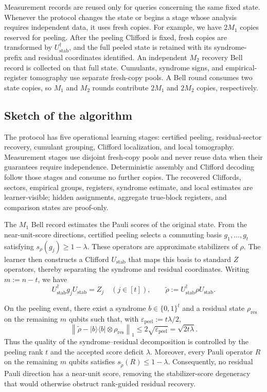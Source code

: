 \documentclass[
  aps,
  prx,
  reprint,
  superscriptaddress,
  amsmath,
  amssymb,
  nofootinbib,
  longbibliography
]{revtex4-2}
\begin{document}
Measurement records are reused only for queries concerning the same fixed state. Whenever the protocol changes the state or begins a stage whose analysis requires independent data, it uses fresh copies.
For example, we have $2M_1$ copies reserved for peeling.  After the
peeling Clifford is fixed, fresh copies are transformed by
$U_{\mathrm{stab}}^\dagger$, and the full peeled state is retained with its
syndrome-prefix and residual coordinates identified.  An independent $M_2$
recovery Bell record is collected on that full state.  Cumulants, syndrome
signs, and empirical-register tomography use separate fresh-copy pools.  A
Bell round consumes two state copies, so $M_1$ and $M_2$ rounds contribute
$2M_1$ and $2M_2$ copies, respectively.

\subsection{Sketch of the algorithm}

The protocol has five operational learning stages: certified peeling,
residual-sector recovery, cumulant grouping, Clifford localization, and local
tomography.  Measurement stages use disjoint fresh-copy pools and never reuse
data when their guarantees require independence.  Deterministic assembly and
Clifford decoding follow those stages and consume no further copies.  The recovered
Cliffords, sectors, empirical groups, registers, syndrome estimate, and local
estimates are learner-visible; hidden assignments, aggregate true-block
registers, and comparison states are proof-only.





The $M_1$ Bell record estimates the Pauli scores of the original state. From
the near-unit-score directions, certified peeling selects a commuting basis
$g_1,\ldots,g_t$ satisfying $s_\rho(g_j)\ge 1-\lambda$. These operators are
approximate stabilizers of $\rho$. The learner then constructs a Clifford
$U_{\mathrm{stab}}$ that maps this basis to standard $Z$ operators, thereby
separating the syndrome and residual coordinates. Writing $m:=n-t$, we have
\begin{equation}
U_{\mathrm{stab}}^\dagger g_jU_{\mathrm{stab}}=Z_j
\quad (j\in[t]),
\qquad
\widetilde\rho
:=
U_{\mathrm{stab}}^\dagger\rho U_{\mathrm{stab}}.
\end{equation}


On the peeling event, there exist a syndrome $b\in\{0,1\}^t$ and a residual
state $\rho_{\mathrm{res}}$ on the remaining $m$ qubits such that, with
$\varepsilon_{\mathrm{peel}}:=t\lambda/2$,
\begin{equation}
\left\|
\widetilde\rho
-
|b\rangle\!\langle b|\otimes\rho_{\mathrm{res}}
\right\|_1
\le
2\sqrt{\varepsilon_{\mathrm{peel}}}
=
\sqrt{2t\lambda}.
\end{equation}
Thus the quality of the syndrome--residual decomposition is controlled by the
peeling rank $t$ and the accepted score deficit $\lambda$. 
Moreover, every Pauli operator $R$  on the remaining $m$ qubits satisfies
$s_{\widetilde\rho}(R)\le 1-\lambda$. Consequently, no 
residual Pauli direction has a near-unit score, removing the stabilizer-score
degeneracy that would otherwise obstruct rank-guided residual recovery.
\end{document}

